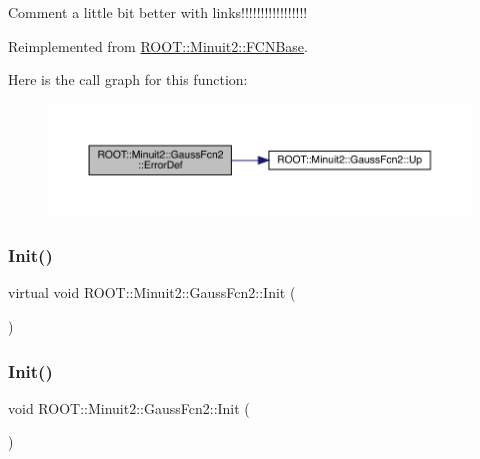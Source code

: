 Comment a little bit better with links!!!!!!!!!!!!!!!!! 

Reimplemented from \mbox{\hyperlink{classROOT_1_1Minuit2_1_1FCNBase_ac4592475c58a65b037ba97ab5f3cba10}{R\+O\+O\+T\+::\+Minuit2\+::\+F\+C\+N\+Base}}.

Here is the call graph for this function\+:
\nopagebreak
\begin{figure}[H]
\begin{center}
\leavevmode
\includegraphics[width=350pt]{da/d5d/classROOT_1_1Minuit2_1_1GaussFcn2_ac240f7b6ecbb7bf842d786e3914c620a_cgraph}
\end{center}
\end{figure}
\mbox{\label{classROOT_1_1Minuit2_1_1GaussFcn2_a6bebb2531692e8896a7ec3b93f1c0776}} 
\subsubsection{\texorpdfstring{Init()}{Init()}\hspace{0.1cm}{\footnotesize\ttfamily [1/2]}}
{\footnotesize\ttfamily virtual void R\+O\+O\+T\+::\+Minuit2\+::\+Gauss\+Fcn2\+::\+Init (\begin{DoxyParamCaption}{ }\end{DoxyParamCaption})\hspace{0.3cm}{\ttfamily [virtual]}}

\mbox{\label{classROOT_1_1Minuit2_1_1GaussFcn2_a4094daab77c76f30bacb299c5c3dfba4}} 
\subsubsection{\texorpdfstring{Init()}{Init()}\hspace{0.1cm}{\footnotesize\ttfamily [2/2]}}
{\footnotesize\ttfamily void R\+O\+O\+T\+::\+Minuit2\+::\+Gauss\+Fcn2\+::\+Init (\begin{DoxyParamCaption}{ }\end{DoxyParamCaption})\hspace{0.3cm}{\ttfamily [virtual]}}

